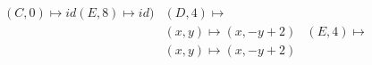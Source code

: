 \documentclass[preview]{standalone}
\begin{document}
\begin{align*}
(C,0) \mapsto id (E,8) \mapsto id) &(D,4) \mapsto \\& (x,y) \mapsto (x, -y + 2) &(E,4) \mapsto \\& (x,y) \mapsto (x, -y + 2)
\end{align*}
\end{document}
